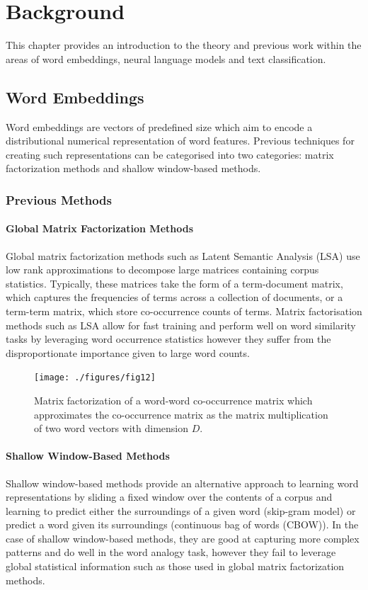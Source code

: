 \chapter{Background}
\label{chap:background}
This chapter provides an introduction to the theory and previous work within the areas of word embeddings, neural language models and text classification. 

\section{Word Embeddings}
Word embeddings are vectors of predefined size which aim to encode a distributional numerical representation of word features. Previous techniques for creating such representations can be categorised into two categories: matrix factorization methods and shallow window-based methods.
\subsection{Previous Methods}
\subsubsection{Global Matrix Factorization Methods}
Global matrix factorization methods such as Latent Semantic Analysis (LSA) use low rank approximations to decompose large matrices containing corpus statistics. Typically, these matrices take the form of a term-document matrix, which captures the frequencies of terms across a collection of documents, or a term-term matrix, which store co-occurrence counts of terms. Matrix factorisation methods such as LSA allow for fast training and perform well on word similarity tasks by leveraging word occurrence statistics however they suffer from the disproportionate importance given to large word counts.

\begin{figure}[h]
	\texttt{[image: ./figures/fig12]}
	\centering
	\caption[Matrix factorization of word-word co-occurence matrix]{Matrix factorization of a word-word co-occurrence matrix which approximates the co-occurrence matrix as the matrix multiplication of two word vectors with dimension \(D\). }
	\label{fig:fig12}
\end{figure}
\subsubsection{Shallow Window-Based Methods}
Shallow window-based methods provide an alternative approach to learning word representations by sliding a fixed window over the contents of a corpus and learning to predict either the surroundings of a given word (skip-gram model) or predict a word given its surroundings (continuous bag of words (CBOW)). In the case of shallow window-based methods, they are good at capturing more complex patterns and do well in the word analogy task, however they fail to leverage global statistical information such as those used in global matrix factorization methods.

